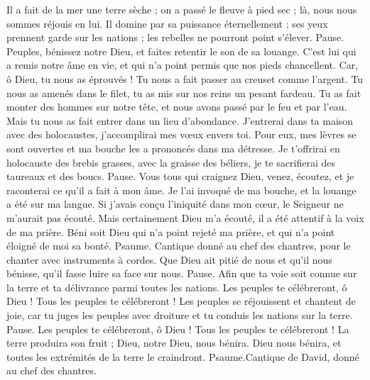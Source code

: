 \begin{multicols}{2}
Il a fait de la mer une terre sèche ; on a passé le fleuve à pied sec ; là, nous nous sommes réjouis en lui.
Il domine par sa puissance éternellement ; ses yeux prennent garde sur les nations ; les rebelles ne pourront point s’élever. Pause.
Peuples, bénissez notre Dieu, et faites retentir le son de sa louange.
C'est lui qui a remis notre âme en vie, et qui n'a point permis que nos pieds chancellent.
Car, ô Dieu, tu nous as éprouvés ! Tu nous a fait passer au creuset comme l'argent.
Tu nous as amenés dans le filet, tu as mis sur nos reins un pesant fardeau.
Tu as fait monter des hommes sur notre tête, et nous avons passé par le feu et par l'eau. Mais tu nous as fait entrer dans un lieu d’abondance.
J'entrerai dans ta maison avec des holocaustes, j’accomplirai mes vœux envers toi.
Pour eux, mes lèvres se sont ouvertes et ma bouche les a prononcés dans ma détresse.
Je t'offrirai en holocauste des brebis grasses, avec la graisse des béliers, je te sacrifierai des taureaux et des boucs. Pause.
Vous tous qui craignez Dieu, venez, écoutez, et je raconterai ce qu'il a fait à mon âme.
Je l'ai invoqué de ma bouche, et la louange a été sur ma langue.
Si j’avais conçu l’iniquité dans mon cœur, le Seigneur ne m’aurait pas écouté.
Mais certainement Dieu m'a écouté, il a été attentif à la voix de ma prière.
Béni soit Dieu qui n'a point rejeté ma prière, et qui n'a point éloigné de moi sa bonté.
\VerseOne{}Psaume. Cantique donné au chef des chantres, pour le chanter avec instruments à cordes.
Que Dieu ait pitié de nous et qu’il nous bénisse, qu'il fasse luire sa face sur nous. Pause.
Afin que ta voie soit connue sur la terre et ta délivrance parmi toutes les nations.
Les peuples te célébreront, ô Dieu ! Tous les peuples te célébreront !
Les peuples se réjouissent et chantent de joie, car tu juges les peuples avec droiture et tu conduis les nations sur la terre. Pause.
Les peuples te célébreront, ô Dieu ! Tous les peuples te célébreront !
La terre produira son fruit ; Dieu, notre Dieu, nous bénira.
Dieu nous bénira, et toutes les extrémités de la terre le craindront.
\VerseOne{}Psaume.Cantique de David, donné au chef des chantres.

\end{multicols}
